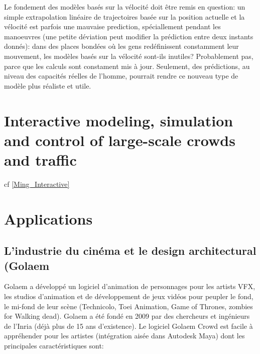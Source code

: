 \documentclass[11pt]{report}
\begin{document}
Le fondement des modèles basés sur la vélocité doit être remis en question: un simple extrapolation linéaire de trajectoires basée sur la position actuelle et la vélocité est parfois une mauvaise prediction, spéciallement pendant les manoeuvres (une petite déviation peut modifier la prédiction entre deux instants donnés): dans des places bondées où les gens redéfinissent constamment leur mouvement, les modèles basés sur la vélocité sont-ils inutiles? Probablement pas, parce que les calculs sont constament mis à jour. Seulement, des prédictions, au niveau des capacités réelles de l'homme, pourrait rendre ce nouveau type de modèle plus réaliste et utile.

\section{Interactive modeling, simulation and control of large-scale crowds and traffic}

cf \ref{Ming_Interactive}

\section{Applications}

\subsection{L'industrie du cinéma et le design architectural (Golaem}

Golaem a développé un logiciel d'animation de personnages pour les artists VFX, les studios d'animation et de développement de jeux vidéos pour peupler le fond, le mi-fond de leur scène (Technicolo, Toei Animation, Game of Thrones, zombies for Walking dead).
Golaem a été fondé en 2009 par des chercheurs et ingénieurs de l'Inria (déjà plus de 15 ans d'existence). Le logiciel Golaem Crowd est facile à appréhender pour les artistes (intégration aisée dans Autodesk Maya) dont les principales caractéristiques sont:
\end{document}
